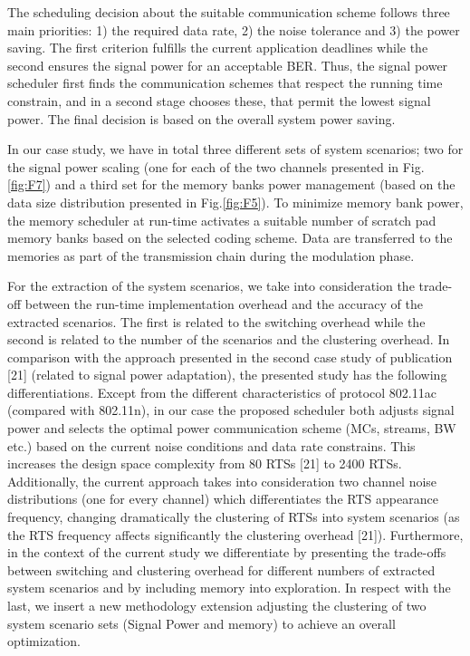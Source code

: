 The scheduling decision about the suitable communication scheme follows three main priorities: 1) the required data rate, 2) the noise tolerance and 3) the power saving. The first criterion fulfills the current application deadlines while the second ensures the signal power for an acceptable BER. Thus, the signal power scheduler first finds the communication schemes that respect the running time constrain, and in a second stage chooses these, that permit the lowest signal power. The final decision is based on the overall system power saving. 

In our case study, we have in total three different sets of system scenarios; two for the signal power scaling (one for each of the two channels presented in Fig.\ref{fig:F7}) and a third set for the memory banks power management (based on the data size distribution presented in Fig.\ref{fig:F5}). To minimize memory bank power, the memory scheduler at run-time activates a suitable number of scratch pad memory banks based on the selected coding scheme. Data are transferred to the memories as part of the transmission chain during the modulation phase.
	
For the extraction of the system scenarios, we take into consideration the trade-off between the run-time implementation overhead and the accuracy of the extracted scenarios. The first is related to the switching overhead while the second is related to the number of the scenarios and the clustering overhead. In comparison with the approach presented in the second case study of publication [21] (related to signal power adaptation), the presented study has the following differentiations. Except from the different characteristics of protocol 802.11ac (compared with 802.11n), in our case the proposed scheduler both adjusts signal power and selects the optimal power communication scheme (MCs, streams, BW etc.) based on the current noise conditions and data rate constrains. This increases the design space complexity from 80 RTSs [21] to 2400 RTSs. Additionally, the current approach takes into consideration two channel noise distributions (one for every channel) which differentiates the RTS appearance frequency, changing dramatically the clustering of RTSs into system scenarios (as the RTS frequency affects significantly the clustering overhead [21]). Furthermore, in the context of the current study we differentiate by presenting the trade-offs between switching and clustering overhead for different numbers of extracted system scenarios and by including memory into exploration. In respect with the last, we insert a new methodology extension adjusting the clustering of two system scenario sets (Signal Power and memory) to achieve an overall optimization.  
	
